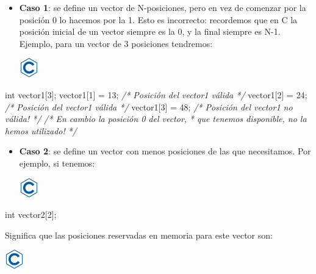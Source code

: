 \documentclass[
]{book}
\newenvironment{Shaded}{\begin{snugshade}}{\end{snugshade}}
\newcommand{\CommentTok}[1]{\textcolor[rgb]{0.56,0.35,0.01}{\textit{#1}}}
\newcommand{\DataTypeTok}[1]{\textcolor[rgb]{0.13,0.29,0.53}{#1}}
\newcommand{\DecValTok}[1]{\textcolor[rgb]{0.00,0.00,0.81}{#1}}
\newcommand{\NormalTok}[1]{#1}
\providecommand{\tightlist}{%
  \setlength{\itemsep}{0pt}\setlength{\parskip}{0pt}}
\begin{document}
\begin{itemize}
\tightlist
\item
  \textbf{Caso 1}: se define un vector de N-posiciones, pero en vez de comenzar por la posición 0 lo hacemos por la 1. Esto es incorrecto: recordemos que en C la posición inicial de un vector siempre es la 0, y la final siempre es N-1. Ejemplo, para un vector de 3 posiciones tendremos:

  \includegraphics{./img/c.png}
\end{itemize}

\begin{Shaded}
\begin{Highlighting}[]
\DataTypeTok{int}\NormalTok{ vector1[}\DecValTok{3}\NormalTok{];}
\NormalTok{vector1[}\DecValTok{1}\NormalTok{] = }\DecValTok{13}\NormalTok{;  }\CommentTok{/* Posición del vector1 válida */}
\NormalTok{vector1[}\DecValTok{2}\NormalTok{] = }\DecValTok{24}\NormalTok{;  }\CommentTok{/* Posición del vector1 válida */}
\NormalTok{vector1[}\DecValTok{3}\NormalTok{] = }\DecValTok{48}\NormalTok{;  }\CommentTok{/* Posición del vector1 no válida! */}
\CommentTok{/* En cambio la posición 0 del vector,}
\CommentTok{ * que tenemos disponible, no la hemos utilizado!}
\CommentTok{ */}
\end{Highlighting}
\end{Shaded}

\begin{itemize}
\tightlist
\item
  \textbf{Caso 2}: se define un vector con menos posiciones de las que necesitamos. Por ejemplo, si tenemos:

  \includegraphics{./img/c.png}
\end{itemize}

\begin{Shaded}
\begin{Highlighting}[]
\DataTypeTok{int}\NormalTok{ vector2[}\DecValTok{2}\NormalTok{];}
\end{Highlighting}
\end{Shaded}

Significa que las posiciones reservadas en memoria para este vector son:

\includegraphics{./img/c.png}
\end{document}
